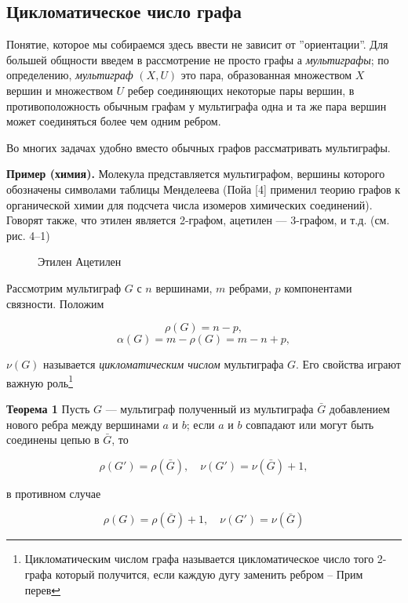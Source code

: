 \subsection{Цикломатическое число графа}

Понятие, которое мы собираемся здесь ввести не зависит от ''ориентации''. Для большей общности введем в рассмотрение не просто графы а \textit{мультиграфы}; по определению, \textit{мультиграф} $(X, U)$ это пара, образованная множеством $X$ вершин и множеством $U$ ребер соединяющих некоторые пары вершин, в противоположность обычным графам у мультиграфа одна и та же пара вершин может соединяться более чем одним ребром.

Во многих задачах удобно вместо обычных графов рассматривать мультиграфы.

\textbf{Пример (химия).} Молекула представляется мультиграфом, вершины которого обозначены символами таблицы Менделеева (Пойа [4] применил теорию графов к органической химии для подсчета числа изомеров химических соединений). Говорят также, что этилен является 2-графом, ацетилен --- 3-графом, и т.д. (см. рис. 4--1)

\begin{figure}[h]
\centering
\begin{tikzpicture}
\end{tikzpicture}
\caption{Этилен \hspace{2cm} Ацетилен}
\label{fig:4-1}
\end{figure}

Рассмотрим мультиграф $G$ с $n$ вершинами, $m$ ребрами, $p$ компонентами связности. Положим

\[\rho(G) = n - p,\]
\[\alpha(G) = m - \rho(G) = m - n + p,\]

$\nu(G)$ называется \textit{цикломатическим числом} мультиграфа $G$. Его свойства играют важную роль\footnote{Цикломатическим числом графа называется цикломатическое число того 2-графа который получится, если каждую дугу заменить ребром -- Прим перев}

\textbf{Теорема 1} Пусть $G$ --- мультиграф полученный из мультиграфа $\bar{G}$ добавлением нового ребра между вершинами $a$ и $b$; если $a$ и $b$ совпадают или могут быть соединены цепью в $\bar{G}$, то

\[\rho(G') = \rho(\bar{G}), \quad \nu(G') = \nu(\bar{G}) + 1,\]

в противном случае

\[\rho(G) = \rho(\bar{G}) + 1, \quad \nu(G') = \nu(\bar{G})\]

